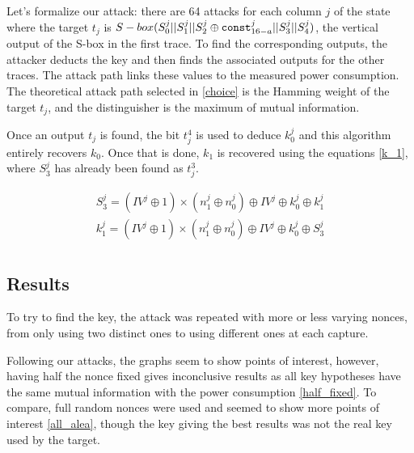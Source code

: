 \documentclass[11pt,technote]{IEEEtran}
\begin{document}
		Let's formalize our attack: there are 64 attacks for each column $j$ of the state where the target $t_j$ is $S-box(S_0^j||S_1^j||S_2^j \oplus \verb|const|_{16-a}^j||S_3^j||S_4^j)$, the vertical output of the S-box in the first trace. To find the corresponding outputs, the attacker deducts the key and then finds the associated outputs for the other traces. The attack path links these values to the measured power consumption. The theoretical attack path selected in \ref{choice} is the Hamming weight of the target $t_j$, and the distinguisher is the maximum of mutual information.
		
		Once an output $t_j$ is found, the bit $t_j^4$ is used to deduce $k_0^j$ and this algorithm entirely recovers $k_0$. Once that is done, $k_1$ is recovered using the equations \ref{k_1}, where $S_3^j$ has already been found as $t_j^3$.
		
		\begin{gather*} \label{k_1}
			S_3^j = (IV^j \oplus 1) \times (n_1^j \oplus n_0^j) \oplus IV^j \oplus k_0^j \oplus k_1^j\\
			k_1^j = (IV^j \oplus 1) \times (n_1^j \oplus n_0^j) \oplus IV^j \oplus k_0^j \oplus S_3^j\\
		\end{gather*}
		
		\subsection{Results}
		To try to find the key, the attack was repeated with more or less varying nonces, from only using two distinct ones to using different ones at each capture.
		
		Following our attacks, the graphs seem to show points of interest, however, having half the nonce fixed gives inconclusive results as all key hypotheses have the same mutual information with the power consumption \ref{half_fixed}. To compare, full random nonces were used and seemed to show more points of interest \ref{all_alea}, though the key giving the best results was not the real key used by the target.
		
\end{document}
